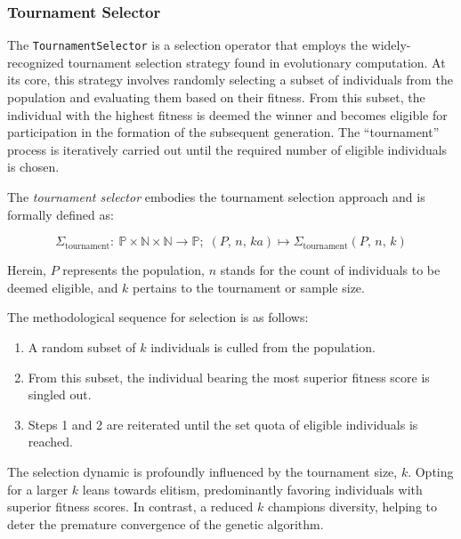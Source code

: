 \subsubsection{Tournament Selector}
\label{sec:keen:operators:selection:tournament}
  The \texttt{TournamentSelector} is a selection operator that employs the 
  widely-recognized tournament selection strategy found in evolutionary 
  computation.
  At its core, this strategy involves randomly selecting a subset of 
  individuals from the population and evaluating them based on their fitness. 
  From this subset, the individual with the highest fitness is deemed the 
  winner and becomes eligible for participation in the formation of the 
  subsequent generation.
  The \enquote{tournament} process is iteratively carried out until the 
  required number of eligible individuals is chosen.

  \begin{definition}
  \label{def:keen:op:select:tournament}
    The \emph{tournament selector} embodies the tournament selection approach 
    and is formally defined as:

    \begin{equation}
      \Sigma_\mathrm{tournament} :\: 
        \mathbb{P} \times \mathbb{N} \times \mathbb{N} \to \mathbb{P};\;
      (P,\, n,\, ka) \mapsto \Sigma_\mathrm{tournament}(P,\, n,\, k)
    \end{equation}

    Herein, \(P\) represents the population, \(n\) stands for the count of 
    individuals to be deemed eligible, and \(k\) pertains to the tournament or 
    sample size.

    The methodological sequence for selection is as follows:

    \begin{enumerate}
      \item A random subset of \(k\) individuals is culled from the population.
      \item From this subset, the individual bearing the most superior fitness 
        score is singled out.
      \item Steps 1 and 2 are reiterated until the set quota of eligible 
        individuals is reached.
    \end{enumerate}
  \end{definition}

  \begin{remark}
    The selection dynamic is profoundly influenced by the tournament size, 
    \(k\).
    Opting for a larger \(k\) leans towards elitism, predominantly favoring 
    individuals with superior fitness scores.
    In contrast, a reduced \(k\) champions diversity, helping to deter the 
    premature convergence of the genetic algorithm.
  \end{remark}


